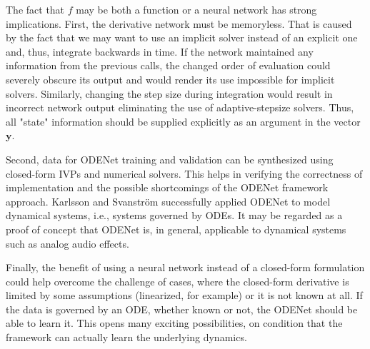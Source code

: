 The fact that $f$ may be both a function or a neural network has strong implications. First, the derivative network must be memoryless. That is caused by the fact that we may want to use an implicit solver instead of an explicit one and, thus, integrate backwards in time. If the network maintained any information from the previous calls, the changed order of evaluation could severely obscure its output and would render its use impossible for implicit solvers. Similarly, changing the step size during integration would result in incorrect network output eliminating the use of adaptive-stepsize solvers. Thus, all "state" information should be supplied explicitly as an argument in the vector $\pmb{y}$.

Second, data for ODENet training and validation can be synthesized using closed-form \acp{IVP} and numerical solvers. This helps in verifying the correctness of implementation and the possible shortcomings of the ODENet framework approach.
Karlsson and Svanstr{\"o}m \cite{Karlsson2019} successfully applied ODENet to model dynamical systems, i.e., systems governed by \acp{ODE}. It may be regarded as a proof of concept that ODENet is, in general, applicable to dynamical systems such as analog audio effects.

Finally, the benefit of using a neural network instead of a closed-form formulation could help overcome the challenge of cases, where the closed-form derivative is limited by some assumptions (linearized, for example) or it is not known at all. If the data is governed by an \ac{ODE}, whether known or not, the ODENet should be able to learn it. This opens many exciting possibilities, on condition that the framework can actually learn the underlying dynamics.
